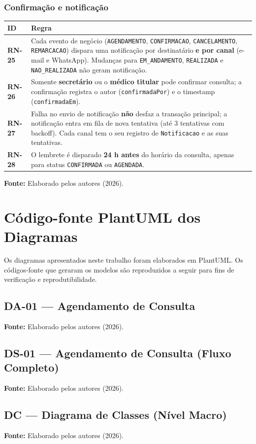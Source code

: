 \documentclass[12pt,a4paper]{article}
\newcommand{\fonte}[1]{%
  \par\vspace{2pt}%
  {\footnotesize\raggedright\textbf{Fonte:} #1\par}%
}
\begin{document}
\subsubsection{Confirmação e notificação}

\begin{table}[H]
\centering
{\footnotesize
\begin{tabularx}{\textwidth}{@{}>{\raggedright\arraybackslash}p{1.8cm}>{\raggedright\arraybackslash}X@{}}
\toprule
ID & Regra \\
\midrule
\textbf{RN-25} & Cada evento de negócio (\texttt{AGENDAMENTO}, \texttt{CONFIRMACAO}, \texttt{CANCELAMENTO}, \texttt{REMARCACAO}) dispara uma notificação por destinatário \textbf{e por canal} (e-mail e WhatsApp). Mudanças para \texttt{EM\_ANDAMENTO}, \texttt{REALIZADA} e \texttt{NAO\_REALIZADA} não geram notificação. \\
\textbf{RN-26} & Somente \textbf{secretário} ou o \textbf{médico titular} pode confirmar consulta; a confirmação registra o autor (\texttt{confirmadaPor}) e o timestamp (\texttt{confirmadaEm}). \\
\textbf{RN-27} & Falha no envio de notificação \textbf{não} desfaz a transação principal; a notificação entra em fila de nova tentativa (até 3 tentativas com backoff). Cada canal tem o seu registro de \texttt{Notificacao} e as suas tentativas. \\
\textbf{RN-28} & O lembrete é disparado \textbf{24 h antes} do horário da consulta, apenas para status \texttt{CONFIRMADA} ou \texttt{AGENDADA}. \\
\bottomrule
\end{tabularx}
}
\fonte{Elaborado pelos autores (2026).}
\end{table}

\newpage
\section{Código-fonte PlantUML dos Diagramas}\label{sec:apendice-codigo}

Os diagramas apresentados neste trabalho foram elaborados em PlantUML. Os
códigos-fonte que geraram os modelos são reproduzidos a seguir para fins
de verificação e reprodutibilidade.

\subsection{DA-01 --- Agendamento de Consulta}


\fonte{Elaborado pelos autores (2026).}

\subsection{DS-01 --- Agendamento de Consulta (Fluxo Completo)}


\fonte{Elaborado pelos autores (2026).}

\subsection{DC --- Diagrama de Classes (Nível Macro)}


\fonte{Elaborado pelos autores (2026).}
\end{document}
